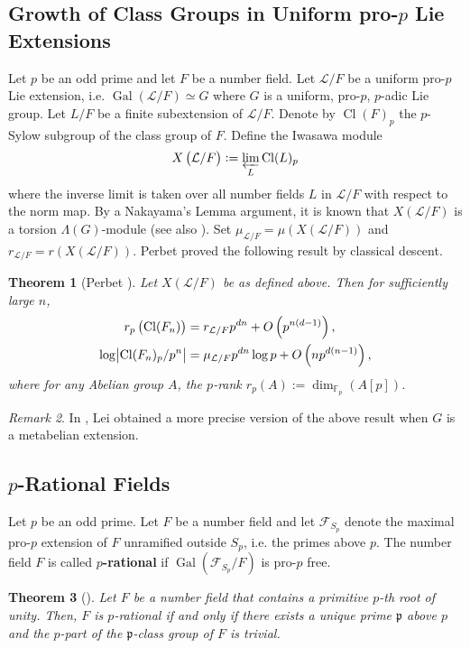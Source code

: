 \documentclass{amsart}
\DeclareMathOperator{\Gal}{Gal}
\DeclareMathOperator{\Cl}{Cl}
\newcommand{\F}{\mathcal F}
\newcommand{\fp}{\mathfrak p}
\newcommand{\Linf}{\mathcal{L}}
\newtheorem{Th}{Theorem}[section]
\theoremstyle{definition}
\theoremstyle{remark}
\newtheorem{rem}[Th]{Remark}
\begin{document}
\subsection{Growth of Class Groups in Uniform pro-$p$ Lie Extensions}
Let $p$ be an odd prime and let $F$ be a number field.
Let $\Linf/F$ be a uniform pro-$p$ Lie extension, i.e. $\Gal(\Linf/F)\simeq G$ where $G$ is a uniform, pro-$p$, $p$-adic Lie group.
Let $L/F$ be a finite subextension of $\Linf/F$.
Denote by $\Cl(F)_p$ the $p$-Sylow subgroup of the class group of $F$.
Define the Iwasawa module
\[
X\left(\Linf/F\right) := \varprojlim_L \Cl(L)_p
\]
where the inverse limit is taken over all number fields $L$ in $\Linf/F$ with respect to the norm map.
By a Nakayama's Lemma argument, it is known that $X(\Linf/F)$ is a torsion $\Lambda(G)$-module \cite{BH97}(see also \cite{Har00}).
Set $\mu_{\Linf/F} = \mu\left(X\left(\Linf/F\right)\right)$ and $r_{\Linf/F} = r\left(X\left(\Linf/F\right)\right)$. 
Perbet proved the following result by classical descent.

\begin{Th}[Perbet \cite{Per12}]
\label{theorem of perbet}
Let $X(\Linf/F)$ be as defined above.
Then for sufficiently large $n$,
\begin{align*}
r_p \left( \Cl(F_n)\right) &= r_{\Linf/F}p^{dn} + O\left(p^{n(d-1)}\right),\\
\log \abs{\Cl(F_n)_p/p^n} &= \mu_{\Linf/F}p^{dn} \log p + O\left(np^{d(n-1)}\right),
\end{align*}
where for any Abelian group $A$, the $p$-rank $r_p(A) := \dim_{\mathbb{F}_p}(A[p])$.
\end{Th}

\begin{rem}
In \cite{Lei17}, Lei obtained a more precise version of the above result when $G$ is a metabelian extension.
\end{rem}

\subsection{$p$-Rational Fields}
Let $p$ be an odd prime.
Let $F$ be a number field and let $\F_{S_p}$ denote the maximal pro-$p$ extension of $F$ unramified outside $S_p$, i.e. the primes above $p$.
The number field $F$ is called \textbf{$p$-rational} if $\Gal(\F_{S_p}/F)$ is pro-$p$ free.

\begin{Th}[{\cite[Theorem IV.3.5]{Gra13}}]
\label{theoretical condition for p-rationality}
Let $F$ be a number field that contains a primitive $p$-th root of unity.
Then, $F$ is $p$-rational if and only if there exists a unique prime $\fp$ above $p$ and the $p$-part of the $\fp$-class group of $F$ is trivial.
\end{Th}
\end{document}
